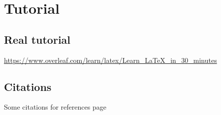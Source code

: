 \chapter{Tutorial}

\section{Real tutorial}

\url{https://www.overleaf.com/learn/latex/Learn_LaTeX_in_30_minutes}

\section{Citations}

Some \cite{md1} citations \cite{lammps} for references page \cite{residence-time} 
